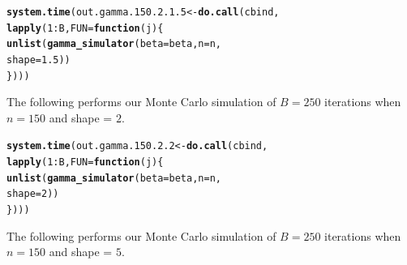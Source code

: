 \documentclass[11pt]{article}\usepackage[]{graphicx}\usepackage[]{color}
\makeatletter
\newcommand{\hlnum}[1]{\textcolor[rgb]{0.686,0.059,0.569}{#1}}%
\newcommand{\hlopt}[1]{\textcolor[rgb]{0,0,0}{#1}}%
\newcommand{\hlstd}[1]{\textcolor[rgb]{0.345,0.345,0.345}{#1}}%
\newcommand{\hlkwa}[1]{\textcolor[rgb]{0.161,0.373,0.58}{\textbf{#1}}}%
\newcommand{\hlkwb}[1]{\textcolor[rgb]{0.69,0.353,0.396}{#1}}%
\newcommand{\hlkwc}[1]{\textcolor[rgb]{0.333,0.667,0.333}{#1}}%
\newcommand{\hlkwd}[1]{\textcolor[rgb]{0.737,0.353,0.396}{\textbf{#1}}}%
\newenvironment{kframe}{%
 \def\at@end@of@kframe{}%
 \ifinner\ifhmode%
  \def\at@end@of@kframe{\end{minipage}}%
  \begin{minipage}{\columnwidth}%
 \fi\fi%
 \def\FrameCommand##1{\hskip\@totalleftmargin \hskip-\fboxsep
 \colorbox{shadecolor}{##1}\hskip-\fboxsep
     \hskip-\linewidth \hskip-\@totalleftmargin \hskip\columnwidth}%
 \MakeFramed {\advance\hsize-\width
   \@totalleftmargin\z@ \linewidth\hsize
   \@setminipage}}%
 {\par\unskip\endMakeFramed%
 \at@end@of@kframe}
\newenvironment{knitrout}{}{} %
\makeatother
\begin{document}
\begin{knitrout}
\color{fgcolor}\begin{kframe}
\begin{alltt}
\hlkwd{system.time}\hlstd{(out.gamma.150.2.1.5} \hlkwb{<-} \hlkwd{do.call}\hlstd{(cbind,}
  \hlkwd{lapply}\hlstd{(}\hlnum{1}\hlopt{:}\hlstd{B,} \hlkwc{FUN} \hlstd{=} \hlkwa{function}\hlstd{(}\hlkwc{j}\hlstd{)\{}
    \hlkwd{unlist}\hlstd{(}\hlkwd{gamma_simulator}\hlstd{(}\hlkwc{beta} \hlstd{= beta,} \hlkwc{n} \hlstd{= n,}
      \hlkwc{shape} \hlstd{=} \hlnum{1.5}\hlstd{))}
\hlstd{\})))}
\end{alltt}


{\ttfamily\noindent\bfseries\color{errorcolor}{\#\# Error in r[, l]/mad.predict.fun(out.mad, xx): non-numeric argument to binary operator}}

{\ttfamily\noindent\itshape\color{messagecolor}{\#\# Timing stopped at: 1.567 0 1.566}}\end{kframe}
\end{knitrout}


The following performs our Monte Carlo simulation of $B = 250$ iterations 
when $n = 150$ and shape = $2$.

\begin{knitrout}
\color{fgcolor}\begin{kframe}
\begin{alltt}
\hlkwd{system.time}\hlstd{(out.gamma.150.2.2} \hlkwb{<-} \hlkwd{do.call}\hlstd{(cbind,}
  \hlkwd{lapply}\hlstd{(}\hlnum{1}\hlopt{:}\hlstd{B,} \hlkwc{FUN} \hlstd{=} \hlkwa{function}\hlstd{(}\hlkwc{j}\hlstd{)\{}
    \hlkwd{unlist}\hlstd{(}\hlkwd{gamma_simulator}\hlstd{(}\hlkwc{beta} \hlstd{= beta,} \hlkwc{n} \hlstd{= n,}
      \hlkwc{shape} \hlstd{=} \hlnum{2}\hlstd{))}
\hlstd{\})))}
\end{alltt}


{\ttfamily\noindent\bfseries\color{errorcolor}{\#\# Error in r[, l]/mad.predict.fun(out.mad, xx): non-numeric argument to binary operator}}

{\ttfamily\noindent\itshape\color{messagecolor}{\#\# Timing stopped at: 1.619 0 1.62}}\end{kframe}
\end{knitrout}


The following performs our Monte Carlo simulation of $B = 250$ iterations 
when $n = 150$ and shape = $5$.
\end{document}

